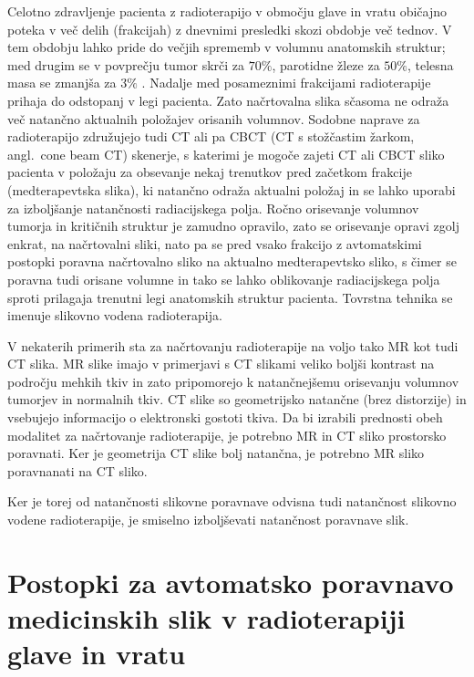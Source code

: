 \documentclass[journal]{IEEEtran}
\begin{document}
Celotno zdravljenje pacienta z radioterapijo v območju glave in vratu običajno poteka v več delih (frakcijah) z dnevnimi presledki skozi obdobje več tednov. V tem obdobju lahko pride do večjih sprememb v volumnu anatomskih struktur; med drugim se v povprečju tumor skrči za $70\%$, parotidne žleze za $50\%$, telesna masa se zmanjša za $3\%$ \cite{al-mayah2015}. Nadalje med posameznimi frakcijami radioterapije prihaja do odstopanj v legi pacienta. Zato načrtovalna slika sčasoma ne odraža več natančno aktualnih položajev orisanih volumnov. Sodobne naprave za radioterapijo združujejo tudi CT ali pa CBCT (CT s stožčastim žarkom, angl.~cone beam CT) skenerje, s katerimi je mogoče zajeti CT ali CBCT sliko pacienta v položaju za obsevanje nekaj trenutkov pred začetkom frakcije (medterapevtska slika), ki natančno odraža aktualni položaj in se lahko uporabi za izboljšanje natančnosti radiacijskega polja. Ročno orisevanje volumnov tumorja in kritičnih struktur je zamudno opravilo, zato se orisevanje opravi zgolj enkrat, na načrtovalni sliki, nato pa se pred vsako frakcijo z avtomatskimi postopki poravna načrtovalno sliko na aktualno medterapevtsko sliko, s čimer se poravna tudi orisane volumne in tako se lahko oblikovanje radiacijskega polja sproti prilagaja trenutni legi anatomskih struktur pacienta. Tovrstna tehnika se imenuje slikovno vodena radioterapija.

V nekaterih primerih sta za načrtovanju radioterapije na voljo tako MR kot tudi CT slika. MR slike imajo v primerjavi s CT slikami veliko boljši kontrast na področju mehkih tkiv in zato pripomorejo k natančnejšemu orisevanju volumnov tumorjev in normalnih tkiv. CT slike so geometrijsko natančne (brez distorzije) in vsebujejo informacijo o elektronski gostoti tkiva. Da bi izrabili prednosti obeh modalitet za načrtovanje radioterapije, je potrebno MR in CT sliko prostorsko poravnati. Ker je geometrija CT slike bolj natančna, je potrebno MR sliko poravnanati na CT sliko.

Ker je torej od natančnosti slikovne poravnave odvisna tudi natančnost slikovno vodene radioterapije, je smiselno izboljševati natančnost poravnave slik.


\section{Postopki za avtomatsko poravnavo medicinskih slik v radioterapiji glave in vratu}
\end{document}
